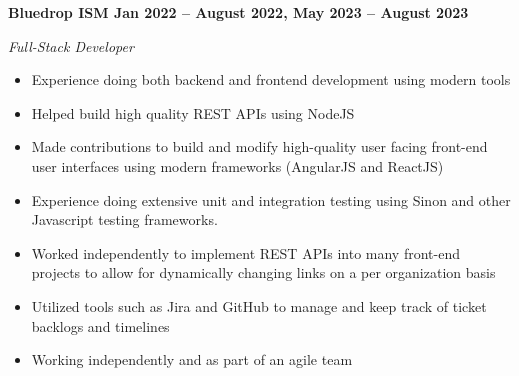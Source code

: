\vspace{0.1cm}
\textbf{Bluedrop ISM \hfill Jan 2022 -- August 2022, May 2023 -- August 2023} \par
\textit{Full-Stack Developer} \par
\begin{itemize}
	\item Experience doing both backend and frontend development using modern tools
    \item Helped build high quality REST APIs using NodeJS
    \item Made contributions to build and modify high-quality user facing front-end user interfaces using modern frameworks (AngularJS and ReactJS)
    \item Experience doing extensive unit and integration testing using Sinon and other Javascript testing frameworks.
    \item Worked independently to implement REST APIs into many front-end projects to allow for dynamically changing links on a per organization basis
    \item Utilized tools such as Jira and GitHub to manage and keep track of ticket backlogs and timelines
    \item Working independently and as part of an agile team
\end{itemize} \par